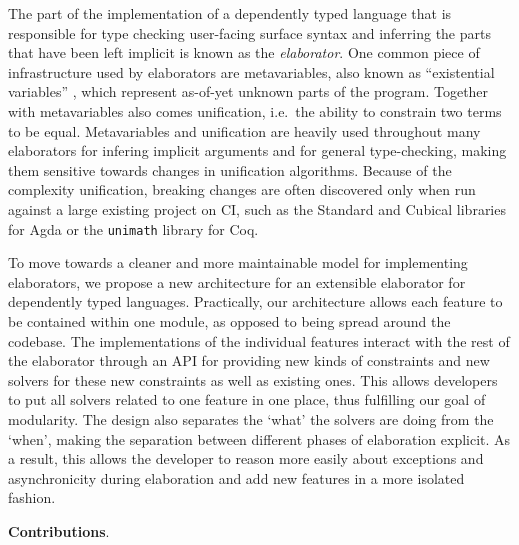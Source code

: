 The part of the implementation of a dependently typed language that is
responsible for type checking user-facing surface syntax and inferring
the parts that have been left implicit is known as the
\emph{elaborator}. One common piece of infrastructure used by
elaborators are metavariables, also known as ``existential variables''
\citep[chap.~2.2.1]{thecoqdevelopmentteamCoqProofAssistant2022}, which
represent as-of-yet unknown parts of the program. Together with
metavariables also comes unification, i.e.~the ability to constrain two
terms to be equal. Metavariables and unification are heavily used
throughout many elaborators for infering implicit arguments and for
general type-checking, making them sensitive towards changes in
unification algorithms. Because of the complexity unification, breaking
changes are often discovered only when run against a large existing
project on CI, such as the Standard and Cubical libraries for Agda or
the \texttt{unimath} library for Coq.

To move towards a cleaner and more maintainable model for implementing
elaborators, we propose a new architecture for an extensible elaborator
for dependently typed languages. Practically, our architecture allows
each feature to be contained within one module, as opposed to being
spread around the codebase. The implementations of the individual
features interact with the rest of the elaborator through an API for
providing new kinds of constraints and new solvers for these new
constraints as well as existing ones. This allows developers to put all
solvers related to one feature in one place, thus fulfilling our goal of
modularity. The design also separates the `what' the solvers are doing
from the `when', making the separation between different phases of
elaboration explicit. As a result, this allows the developer to reason
more easily about exceptions and asynchronicity during elaboration and
add new features in a more isolated fashion.

\textbf{Contributions}.

